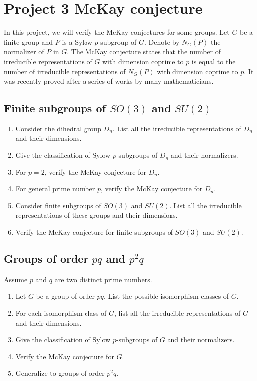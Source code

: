 \documentclass[12pt]{article}
\theoremstyle{definition}
\theoremstyle{remark}
\begin{document}
\section{Project 3 McKay conjecture}
In this project, we will verify the McKay conjectures for some groups. Let $G$ be a finite group and $P$ is a Sylow $p$-subgroup of $G$. Denote by $N_G(P)$ the normalizer of $P$ in $G$. The McKay conjecture states that the number of irreducible representations of $G$ with dimension coprime to $p$ is equal to the number of irreducible representations of $N_G(P)$ with dimension coprime to $p$. It was recently proved after a series of works by many mathematicians. 

\subsection{Finite subgroups of $SO(3)$ and $SU(2)$}
\begin{enumerate}
    \item Consider the dihedral group $D_n$. List all the irreducible representations of $D_n$ and their dimensions.
    \item Give the classification of Sylow $p$-subgroups of $D_n$ and their normalizers.
    \item For $p=2$, verify the McKay conjecture for $D_n$.
    \item For general prime number $p$, verify the McKay conjecture for $D_n$.
    \item Consider finite subgroups of $SO(3)$ and $SU(2)$. List all the irreducible representations of these groups and their dimensions.
    \item Verify the McKay conjecture for finite subgroups of $SO(3)$ and $SU(2)$.
\end{enumerate}

\subsection{Groups of order $pq$ and $p^2q$}
Assume $p$ and $q$ are two distinct prime numbers.
\begin{enumerate}
    \item Let $G$ be a group of order $pq$. List the possible isomorphism classes of $G$.
    \item For each isomorphism class of $G$, list all the irreducible representations of $G$ and their dimensions.
    \item Give the classification of Sylow $p$-subgroups of $G$ and their normalizers.
    \item Verify the McKay conjecture for $G$.
    \item Generalize to groups of order $p^2q$.
\end{enumerate}
\end{document}
